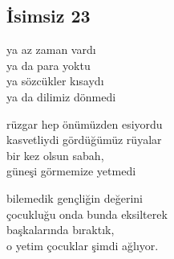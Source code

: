 \subsection{İsimsiz 23}

ya az zaman vardı \\
ya da para yoktu \\
ya sözcükler kısaydı \\
ya da dilimiz dönmedi

\noindent\newline
rüzgar hep önümüzden esiyordu \\
kasvetliydi gördüğümüz rüyalar \\
bir kez olsun sabah, \\
güneşi görmemize yetmedi

\noindent\newline
bilemedik gençliğin değerini \\
çocukluğu onda bunda eksilterek \\
başkalarında bıraktık, \\
o yetim çocuklar şimdi ağlıyor.